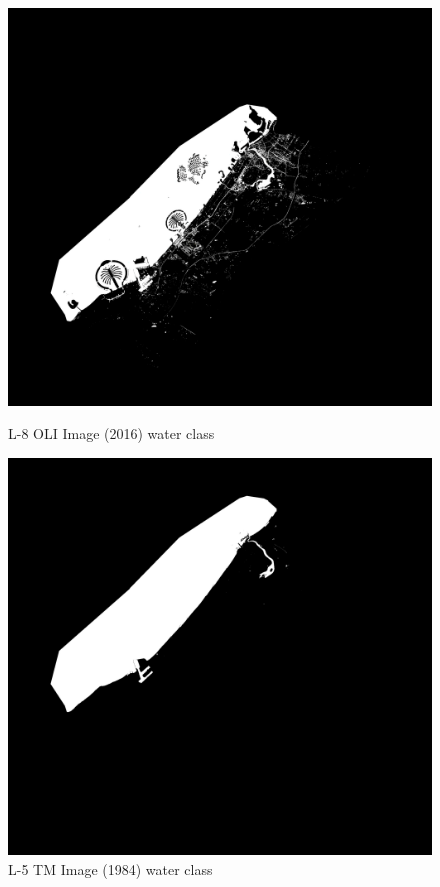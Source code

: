 \begin{figure}[h!]
\centering
\begin{minipage}{.5\textwidth}
	\centering
	\includegraphics[width=\textwidth-3em]{code/imagedata/analysis/water2016cropped_refd_w}
	\caption{L-8 OLI Image (2016) water class}
	\label{fig:water_2016}
\end{minipage}%
\begin{minipage}{.5\textwidth}
	\centering
	\includegraphics[width=\textwidth-3em]{code/imagedata/analysis/water1984cropped_refd_w}
	\caption{L-5 TM Image (1984) water class}
	\label{fig:water_1984}
\end{minipage}
\end{figure}

